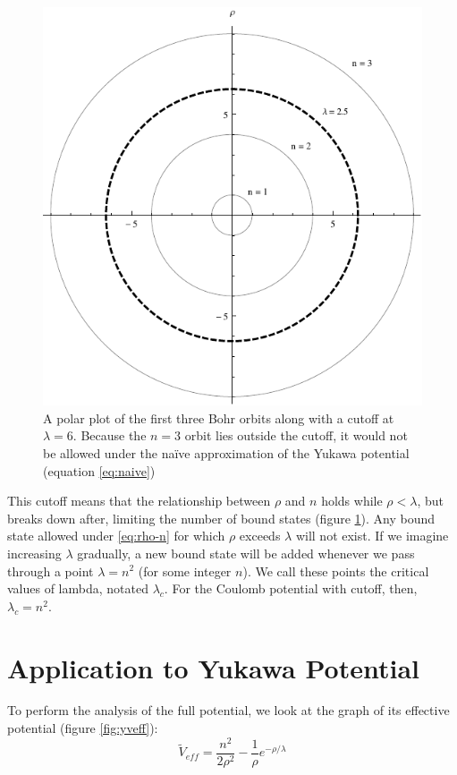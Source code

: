 \documentclass[12pt,twoside]{reedthesis}
\newcommand{\eqn}[1]{\begin{equation}#1\end{equation}}
\newcommand{\fig}[2]{\begin{figure}\begin{center}#1\end{center}#2\end{figure}}
\begin{document}
\fig{
\includegraphics{Figures/cutoff}}
{
\caption{A polar plot of the first three Bohr orbits along with a cutoff at $\lambda = 6$. Because the $n=3$ orbit lies outside the cutoff, it would not be allowed under the na\"ive approximation of the Yukawa potential (equation \eqref{eq:naive})}
\label{fig:cutoff}
}

This cutoff means that the relationship between $\rho$ and $n$ holds while $\rho < \lambda$, but breaks down after, limiting the number of bound states (figure \ref{fig:cutoff}). Any bound state allowed under \eqref{eq:rho-n} for which $\rho$ exceeds $\lambda$ will not exist. If we imagine increasing $\lambda$ gradually, a new bound state will be added whenever we pass through a point $\lambda = n^2$ (for some integer $n$). We call these points the critical values of lambda, notated $\lambda_c$. For the Coulomb potential with cutoff, then, $\lambda_c = n^2$.

\section{Application to Yukawa Potential}
To perform the analysis of the full potential, we look at the graph of its effective potential (figure \ref{fig:yveff}):
\eqn{
\tilde{V}_{eff} = \frac{n^2}{2 \rho^2} - \frac{1}{\rho}e^{-\rho/\lambda}
\label{eq:yveff}
}
 
\end{document}
